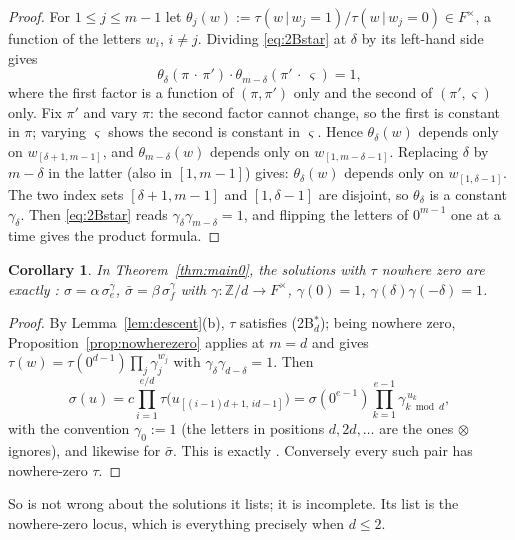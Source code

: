 \documentclass[11pt]{article}
\newtheorem{corollary}[theorem]{Corollary}
\theoremstyle{definition}
\theoremstyle{remark}
\newcommand{\Z}{\mathbb{Z}}
\begin{document}
\begin{proof}
For $1\le j\le m-1$ let $\theta_j(w):=\tau(w\,|\,w_j=1)/\tau(w\,|\,w_j=0)\in F^{\times}$, a
function of the letters $w_i$, $i\ne j$.  Dividing \eqref{eq:2Bstar} at $\delta$ by its
left-hand side gives
\[
   \theta_\delta(\pi\,\cdot\,\pi')\cdot\theta_{m-\delta}(\pi'\,\cdot\,\varsigma)=1 ,
\]
where the first factor is a function of $(\pi,\pi')$ only and the second of
$(\pi',\varsigma)$ only.  Fix $\pi'$ and vary $\pi$: the second factor cannot change, so the
first is constant in $\pi$; varying $\varsigma$ shows the second is constant in $\varsigma$.
Hence $\theta_\delta(w)$ depends only on $w_{[\delta+1,m-1]}$, and $\theta_{m-\delta}(w)$
depends only on $w_{[1,m-\delta-1]}$.  Replacing $\delta$ by $m-\delta$ in the latter (also
in $[1,m-1]$) gives: $\theta_{\delta}(w)$ depends only on $w_{[1,\delta-1]}$.  The two index
sets $[\delta+1,m-1]$ and $[1,\delta-1]$ are disjoint, so $\theta_\delta$ is a constant
$\gamma_\delta$.  Then \eqref{eq:2Bstar} reads $\gamma_\delta\gamma_{m-\delta}=1$, and
flipping the letters of $0^{m-1}$ one at a time gives the product formula.
\end{proof}

\begin{corollary}\label{cor:agree}
In Theorem~\ref{thm:main0}, the solutions with $\tau$ nowhere zero are exactly
\cite[Thm.~5.2(c)]{Q149}: $\sigma=\alpha\,\sigma^{\gamma}_e$, $\bar\sigma=\beta\,
\sigma^{\gamma}_f$ with $\gamma:\Z/d\to F^\times$, $\gamma(0)=1$,
$\gamma(\delta)\gamma(-\delta)=1$.
\end{corollary}

\begin{proof}
By Lemma~\ref{lem:descent}(b), $\tau$ satisfies (2B$^*_d$); being nowhere zero,
Proposition~\ref{prop:nowherezero} applies at $m=d$ and gives
$\tau(w)=\tau(0^{d-1})\prod_j\gamma_j^{w_j}$ with $\gamma_\delta\gamma_{d-\delta}=1$.  Then
\[
  \sigma(u)=c\prod_{i=1}^{e/d}\tau\bigl(u_{[(i-1)d+1,\,id-1]}\bigr)
   =\sigma(0^{e-1})\prod_{k=1}^{e-1}\gamma_{k\bmod d}^{\,u_k},
\]
with the convention $\gamma_0:=1$ (the letters in positions $d,2d,\dots$ are the ones
$\otimes$ ignores), and likewise for $\bar\sigma$.  This is exactly
\cite[Conv.~5.1]{Q149}.  Conversely every such pair has nowhere-zero $\tau$.
\end{proof}

So \cite[Thm.~5.2]{Q149} is not wrong about the solutions it lists; it is incomplete.  Its
list is the nowhere-zero locus, which is everything precisely when $d\le2$.
\end{document}
